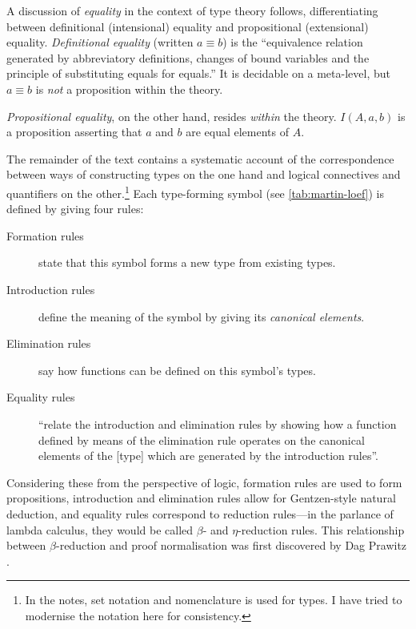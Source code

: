 \documentclass[12pt,toc=bibliography,numbers=noendperiod,
               footnotes=multiple,twoside]{scrartcl}
\begin{document}
A discussion of \emph{equality} in the context of type theory follows, differentiating between definitional (intensional) equality and propositional (extensional) equality. \emph{Definitional equality} (written \(a \equiv b\)) is the \enquote{equivalence relation generated by abbreviatory definitions, changes of bound variables and the principle of substituting equals for equals.} It is decidable on a meta-level, but \(a \equiv b\) is \emph{not} a proposition within the theory.

\emph{Propositional equality}, on the other hand, resides \emph{within} the theory. \(I(A, a, b)\) is a proposition asserting that \(a\) and \(b\) are equal elements of \(A\).

The remainder of the text contains a systematic account of the correspondence between ways of constructing types on the one hand and logical connectives and quantifiers on the other.\footnote{In the notes, set notation and nomenclature is used for types. I have tried to modernise the notation here for consistency.} Each type-forming symbol (see \cref{tab:martin-loef}) is defined by giving four rules:

\begin{description}
\item[Formation rules] state that this symbol forms a new type from existing types.
\item[Introduction rules] define the meaning of the symbol by giving its \emph{canonical elements}.
\item[Elimination rules] say how functions can be defined on this symbol's types.
\item[Equality rules] \enquote{relate the introduction and elimination rules by showing how a function defined by means of the elimination rule operates on the canonical elements of the [type] which are generated by the introduction rules}.
\end{description}

Considering these from the perspective of logic, formation rules are used to form propositions, introduction and elimination rules allow for Gentzen-style natural deduction, and equality rules correspond to reduction rules---in the parlance of lambda calculus, they would be called \(\beta\)- and \(\eta\)-reduction rules. This relationship between \(\beta\)-reduction and proof normalisation was first discovered by Dag Prawitz \autocite{prawitz_natural_1965}.
\end{document}
